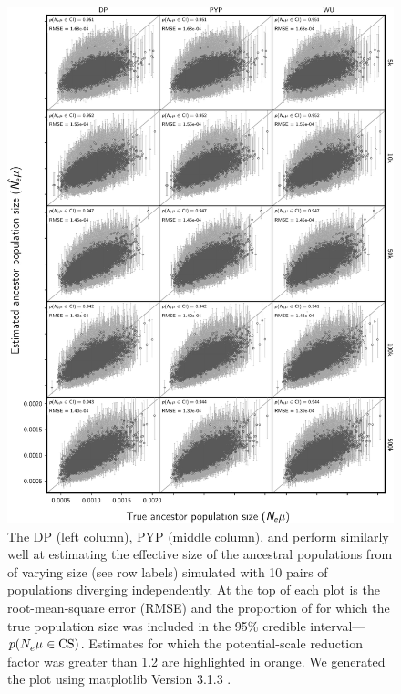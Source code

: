\begin{figure}[htbp]
    \begin{center}
        \includegraphics[width=\textwidth,height=0.9\textheight,keepaspectratio]{../images/from-project-repo/nchars-ancestor-size-scatter-cropped.pdf}
        \captionsetup{name=Figure S, labelformat=noSpace, listformat=sFigList}
        \caption{\footnotesize
        The DP (left column),
        PYP (middle column),
        and
        \wunif
        perform similarly well at estimating the effective size of the
        ancestral populations from \datasets of varying size (see row labels)
        simulated with 10 pairs of populations diverging independently.
        At the top of each plot is the root-mean-square error (RMSE)
        and
        the proportion of \datasets for which the true population size was
        included in the 95\% credible interval---$p(N_{e}^{}\mu_{} \in
        \textrm{CS})$.
        Estimates for which the potential-scale reduction factor was greater
        than 1.2 \citep{Brooks1998} are highlighted in orange.
        We generated the plot using matplotlib Version 3.1.3
        \citep{matplotlib}.
        }
        \label{fig:ancpopsizegridbysize}
    \end{center}
\end{figure}

